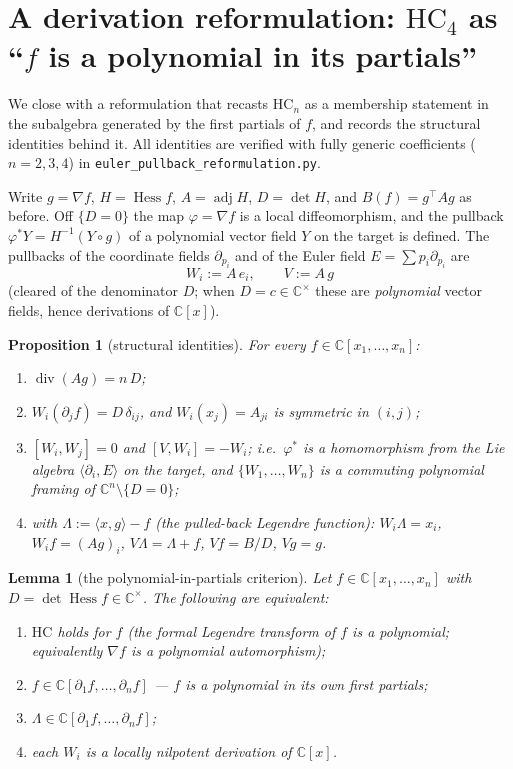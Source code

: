 \documentclass[11pt]{article}
\theoremstyle{plain}
\newtheorem{proposition}[theorem]{Proposition}
\newtheorem{lemma}[theorem]{Lemma}
\theoremstyle{definition}
\newcommand{\C}{\mathbb{C}}
\newcommand{\Hess}{\operatorname{Hess}}
\newcommand{\adj}{\operatorname{adj}}
\newcommand{\HC}{\mathrm{HC}}
\begin{document}
\section{A derivation reformulation: $\HC_4$ as ``$f$ is a polynomial in its
partials''}\label{sec:reform}

We close with a reformulation that recasts $\HC_n$ as a membership
statement in the subalgebra generated by the first partials of $f$, and
records the structural identities behind it. All identities are verified
with fully generic coefficients ($n=2,3,4$) in
\texttt{euler\_pullback\_reformulation.py}.

Write $g=\nabla f$, $H=\Hess f$, $A=\adj H$, $D=\det H$, and
$B(f)=g^\top A g$ as before. Off $\{D=0\}$ the map $\varphi=\nabla f$ is a
local diffeomorphism, and the pullback $\varphi^*Y=H^{-1}(Y\circ g)$ of a
polynomial vector field $Y$ on the target is defined. The pullbacks of the
coordinate fields $\partial_{p_i}$ and of the Euler field $E=\sum p_i\partial_{p_i}$
are
\[
  W_i:=A\,e_i,\qquad V:=A\,g
\]
(cleared of the denominator $D$; when $D=c\in\C^\times$ these are
\emph{polynomial} vector fields, hence derivations of $\C[x]$).

\begin{proposition}[structural identities]\label{prop:Wident}
For every $f\in\C[x_1,\dots,x_n]$:
\begin{enumerate}
\item[\rm(I1)] $\operatorname{div}(A g)=n\,D$;
\item[\rm(I2)] $W_i(\partial_jf)=D\,\delta_{ij}$, and $W_i(x_j)=A_{ji}$ is
symmetric in $(i,j)$;
\item[\rm(I3)] $[W_i,W_j]=0$ and $[V,W_i]=-W_i$; i.e.\ $\varphi^*$ is a
homomorphism from the Lie algebra $\langle\partial_i,E\rangle$ on the
target, and $\{W_1,\dots,W_n\}$ is a commuting polynomial framing of
$\C^n\setminus\{D=0\}$;
\item[\rm(I4)] with $\Lambda:=\langle x,g\rangle-f$ (the pulled-back
Legendre function): $W_i\Lambda=x_i$, $W_if=(Ag)_i$,
$V\Lambda=\Lambda+f$, $Vf=B/D$, $Vg=g$.
\end{enumerate}
\end{proposition}

\begin{lemma}[the polynomial-in-partials criterion]\label{lem:R}
Let $f\in\C[x_1,\dots,x_n]$ with $D=\det\Hess f\in\C^\times$. The following
are equivalent:
\begin{enumerate}
\item[\rm(a)] $\HC$ holds for $f$ (the formal Legendre transform of $f$ is
a polynomial; equivalently $\nabla f$ is a polynomial automorphism);
\item[\rm(b)] $f\in\C[\partial_1f,\dots,\partial_nf]$ --- $f$ is a
polynomial in its own first partials;
\item[\rm(c)] $\Lambda\in\C[\partial_1f,\dots,\partial_nf]$;
\item[\rm(d)] each $W_i$ is a locally nilpotent derivation of $\C[x]$.
\end{enumerate}
\end{lemma}
\end{document}
